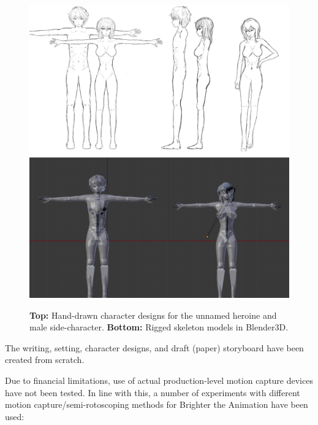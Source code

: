 \begin{figure}[t]
    \centering
    \includegraphics[width=1\linewidth]{img/results/char.pdf} \\
    \caption{\textbf{Top:} Hand-drawn character designs for the unnamed heroine and male side-character. \textbf{Bottom:} Rigged skeleton models in Blender3D.}
    \vspace{-15pt}
    \label{fig:workflow}
\end{figure}

The writing, setting, character designs, and draft (paper) storyboard have been created from scratch.

Due to financial limitations, use of actual production-level motion capture devices have not been tested. In line with this, a number of experiments with different motion capture/semi-rotoscoping methods for Brighter the Animation have been used:

